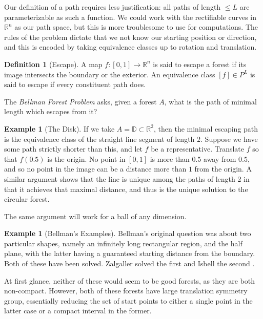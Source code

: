 \documentclass[10pt,a4paper]{article}
\theoremstyle{definition}
\newtheorem{dfn}[thm]{Definition}
\newtheorem{example}[thm]{Example}
\def\R{\mathbb{R}}
\begin{document}
Our definition of a path requires less justification: all paths of length $\leq L$ are parameterizable as such a function. We could work with the rectifiable curves in $\R^n$ as our path space, but this is more troublesome to use for computations. The rules of the problem dictate that we not know our starting position or direction, and this is encoded by taking equivalence classes up to rotation and translation.

\begin{dfn}[Escape]
A map $f:[0,1]\rightarrow \R^n$ is said to escape a forest if its image intersects the boundary or the exterior. An equivalence class $[f]\in P^L$ is said to escape if every constituent path does.
\end{dfn}
\label{dfn:escape}

The \textit{Bellman Forest Problem} asks, given a forest $A$, what is the path of minimal length which escapes from it?

\begin{example}[The Disk]
If we take $A = \mathbb{D}\subset \R^2$, then the minimal escaping path is the equivalence class of the straight line segment of length $2$.
Suppose we have some path strictly shorter than this, and let $f$ be a representative. Translate $f$ so that $f(0.5)$ is the origin. No point in $[0,1]$ is more than $0.5$ away from $0.5$, and so no point in the image can be a distance more than $1$  from the origin. A similar argument shows that the line is unique among the paths of length 2 in that it achieves that maximal distance, and thus is the unique solution to the circular forest.
\end{example}
\label{example:disk}
The same argument will work for a ball of any dimension.

\begin{example}[Bellman's Examples]
Bellman's original question was about two particular shapes, namely an infinitely long rectangular region, and the half plane, with the latter having a guaranteed starting distance from the boundary. Both of these have been solved. Zalgaller solved the first \cite{Zalgaller1} and Isbell the second \cite{isbell1957optimal}.

At first glance, neither of these would seem to be good forests, as they are both non-compact. However, both of these forests have large translation symmetry group, essentially reducing the set of start points to either a single point in the latter case or a compact interval in the former. 

\end{example}
\label{example:bell}
\end{document}
